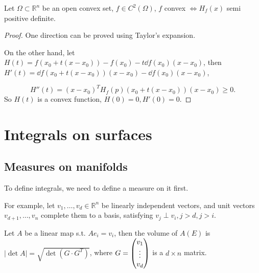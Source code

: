 \begin{theorem}
    Let $\Omega \subset \mathbb{R}^{n}$ be an open convex set,
	$f\in C ^2(\Omega)$, $f$ convex $\iff H_f(x)$ semi positive definite.
\end{theorem}
\begin{proof}[Proof]
    One direction can be proved using Taylor's expansion.

	On the other hand,
	let $H(t) = f(x_0 + t(x - x_0)) - f(x_0) -t\dd f(x_0)(x- x_0)$,
	then $H'(t) = \dd f(x_0 + t(x - x_0)) (x - x_0) - \dd f(x_0)(x - x_0)$,

	\[
		H''(t) = (x - x_0)^TH_f(p)(x_0 + t(x-x_0)) (x-x_0)\ge 0.
	\]
	So $H(t)$ is a convex function, $H(0) = 0, H'(0) = 0$.
\end{proof}

\section{Integrals on surfaces}
\label{sec:Integrals on surfaces}

\subsection{Measures on manifolds}
\label{sub:Measures on manifolds}
To define integrals, we need to define a measure on it first.

For example, let $v_1,\dots,v_d\in \mathbb{R}^{n}$ be linearly independent vectors,
and unit vectors $v_{d+1},\dots,v_n$ complete them to a basis,
satisfying $v_j \perp v_i, j > d, j > i$.

Let $A$ be a linear map s.t. $Ae_i = v_i$, then the volume of $A(E)$ is
$|\det A| = \sqrt{\det(G\cdot G^T)}$, where $G = \begin{pmatrix} v_1\\ \vdots\\v_d \end{pmatrix}$ is
a $d\times n$ matrix.
